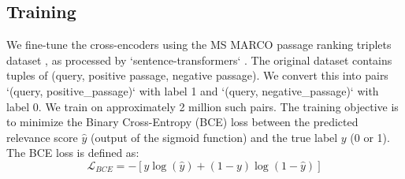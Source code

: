 \documentclass[conference]{IEEEtran}
\begin{document}
\subsection{Training}
We fine-tune the cross-encoders using the MS MARCO passage ranking triplets dataset \cite{bajaj2016ms}, as processed by `sentence-transformers` \cite{reimers2019sentence}. The original dataset contains tuples of (query, positive passage, negative passage). We convert this into pairs `(query, positive\_passage)` with label 1 and `(query, negative\_passage)` with label 0. We train on approximately 2 million such pairs.
The training objective is to minimize the Binary Cross-Entropy (BCE) loss between the predicted relevance score $\hat{y}$ (output of the sigmoid function) and the true label $y$ (0 or 1). The BCE loss is defined as:
\[ \mathcal{L}_{BCE} = - [y \log(\hat{y}) + (1 - y) \log(1 - \hat{y})] \]

\end{document}
